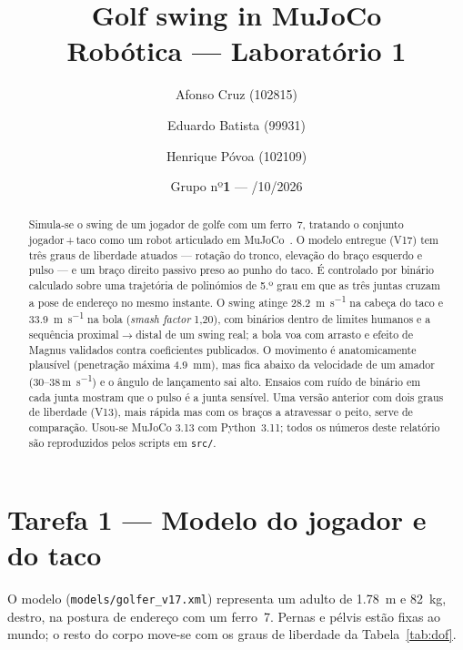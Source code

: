 \documentclass[11pt,a4paper]{article}
\title{\textbf{Golf swing in MuJoCo}\\[2mm]
       \large Robótica --- Laboratório 1}
\author{{Afonso Cruz (102815)} \and {Eduardo Batista (99931)} \and {Henrique Póvoa (102109)}}
\date{Grupo {nº\textbf{1}} \quad --- \quad 9/10/2026}
\begin{document}
\maketitle

\begin{abstract}
\noindent
Simula-se o swing de um jogador de golfe com um ferro~7, tratando o conjunto
jogador\,+\,taco como um robot articulado em MuJoCo~\cite{todorov2012}. O
modelo entregue (V17) tem três graus de liberdade atuados --- rotação do tronco,
elevação do braço esquerdo e pulso --- e um braço direito passivo preso ao
punho do taco. É controlado por binário calculado sobre uma trajetória de
polinómios de 5.º grau em que as três juntas cruzam a pose de endereço no
mesmo instante. O swing atinge \SI{28.2}{\meter\per\second} na cabeça do taco
e \SI{33.9}{\meter\per\second} na bola (\emph{smash factor} 1,20), com
binários dentro de limites humanos e a sequência proximal$\to$distal de um
swing real; a bola voa com arrasto e efeito de Magnus validados contra
coeficientes publicados. O movimento é anatomicamente plausível (penetração
máxima \SI{4.9}{\milli\meter}), mas fica abaixo da velocidade de um amador
(30--38\,\si{\meter\per\second}) e o ângulo de lançamento sai alto. Ensaios
com ruído de binário em cada junta mostram que o pulso é a junta sensível. Uma
versão anterior com dois graus de liberdade (V13), mais rápida mas com os
braços a atravessar o peito, serve de comparação. Usou-se MuJoCo 3.13 com
Python~3.11; todos os números deste relatório são reproduzidos pelos scripts
em \texttt{src/}.
\end{abstract}


\section{Tarefa 1 --- Modelo do jogador e do taco}

O modelo (\texttt{models/golfer\_v17.xml}) representa um adulto de
\SI{1.78}{\meter} e \SI{82}{\kilo\gram}, destro, na postura de endereço com um
ferro~7. Pernas e pélvis estão fixas ao mundo; o resto do corpo move-se com os
graus de liberdade da Tabela~\ref{tab:dof}.
\end{document}

